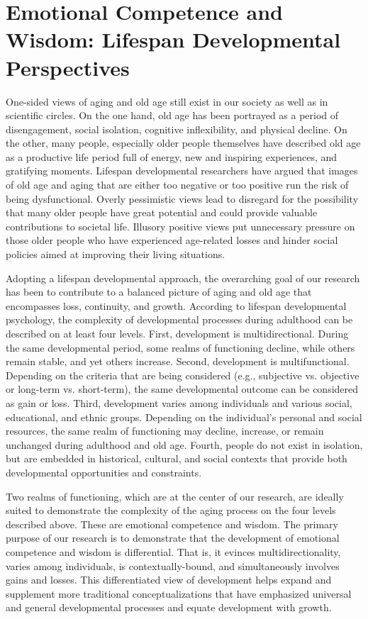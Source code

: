 \section{Emotional Competence and Wisdom: Lifespan Developmental Perspectives} 

One-sided views of aging and old age still exist in our society as well as in scientific circles. On the one hand, old age has been portrayed as a period of disengagement, social isolation, cognitive inflexibility, and physical decline. On the other, many people, especially older people themselves have described old age as a productive life period full of energy, new and inspiring experiences, and gratifying moments. Lifespan developmental researchers have argued that images of old age and aging that are either too negative or too positive run the risk of being dysfunctional. Overly pessimistic views lead to disregard for the possibility that many older people have great potential and could provide valuable contributions to societal life. Illusory positive views put unnecessary pressure on those older people who have experienced age-related losses and hinder social policies aimed at improving their living situations.

 Adopting a lifespan developmental approach, the overarching goal of our research has been to contribute to a balanced picture of aging and old age that encompasses loss, continuity, and growth. According to lifespan developmental psychology, the complexity of developmental processes during adulthood can be described on at least four levels. First, development is multidirectional. During the same developmental period, some realms of functioning decline, while others remain stable, and yet others increase. Second, development is multifunctional. Depending on the criteria that are being considered (e.g., subjective vs. objective or long-term vs. short-term), the same developmental outcome can be considered as gain or loss. Third, development varies among individuals and various social, educational, and ethnic groups. Depending on the individual's personal and social resources, the same realm of functioning may decline, increase, or remain unchanged during adulthood and old age. Fourth, people do not exist in isolation, but are embedded in historical, cultural, and social contexts that provide both developmental opportunities and constraints.

 Two realms of functioning, which are at the center of our research, are ideally suited to demonstrate the complexity of the aging process on the four levels described above. These are emotional competence and wisdom. The primary purpose of our research is to demonstrate that the development of emotional competence and wisdom is differential. That is, it evinces multidirectionality, varies among individuals, is contextually-bound, and simultaneously involves gains and losses. This differentiated view of development helps expand and supplement more traditional conceptualizations that have emphasized universal and general developmental processes and equate development with growth. 

